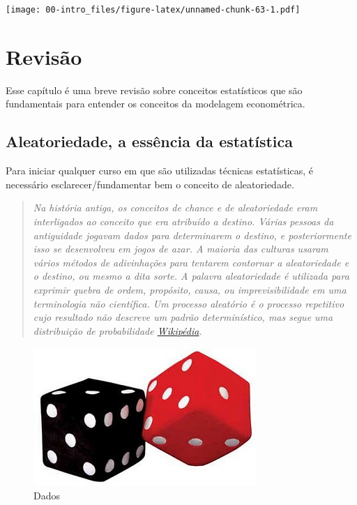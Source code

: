 \documentclass[
]{book}
\theoremstyle{definition}
\theoremstyle{definition}
\theoremstyle{definition}
\theoremstyle{remark}
\begin{document}
\texttt{[image: 00-intro\_files/figure-latex/unnamed-chunk-63-1.pdf]}

\hypertarget{rev}{%
\chapter{Revisão}\label{rev}}

Esse capítulo é uma breve revisão sobre conceitos estatísticos que são fundamentais para entender os conceitos da modelagem econométrica.

\hypertarget{aleatoriedade-a-essuxeancia-da-estatuxedstica}{%
\section{Aleatoriedade, a essência da estatística}\label{aleatoriedade-a-essuxeancia-da-estatuxedstica}}

Para iniciar qualquer curso em que são utilizadas técnicas estatísticas, é necessário esclarecer/fundamentar bem o conceito de aleatoriedade.

\begin{quote}
\emph{Na história antiga, os conceitos de chance e de aleatoriedade eram interligados ao conceito que era atribuído a destino. Várias pessoas da antiguidade jogavam dados para determinarem o destino, e posteriormente isso se desenvolveu em jogos de azar. A maioria das culturas usaram vários métodos de adivinhações para tentarem contornar a aleatoriedade e o destino, ou mesmo a dita sorte. A palavra aleatoriedade é utilizada para exprimir quebra de ordem, propósito, causa, ou imprevisibilidade em uma terminologia não científica. Um processo aleatório é o processo repetitivo cujo resultado não descreve um padrão determinístico, mas segue uma distribuição de probabilidade \href{https://pt.wikipedia.org/wiki/Aleatoriedade}{Wikipédia}.}
\end{quote}

\begin{figure}

{\centering \includegraphics[width=0.33\linewidth]{Figuras/dados-vp} 

}

\caption{Dados}\label{fig:dados}
\end{figure}
\end{document}
